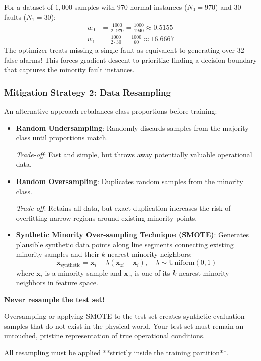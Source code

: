 For a dataset of $1{,}000$ samples with $970$ normal instances ($N_0 = 970$) and $30$ faults ($N_1 = 30$):
\begin{align*}
w_0 &= \frac{1000}{2 \cdot 970} = \frac{1000}{1940} \approx \mathbf{0.5155} \\
w_1 &= \frac{1000}{2 \cdot 30} = \frac{1000}{60} \approx \mathbf{16.6667}
\end{align*}
The optimizer treats missing a single fault as equivalent to generating over $32$ false alarms! This forces gradient descent to prioritize finding a decision boundary that captures the minority fault instances.

\subsubsection{Mitigation Strategy 2: Data Resampling}
An alternative approach rebalances class proportions before training:
\begin{itemize}
    \item \textbf{Random Undersampling}: Randomly discards samples from the majority class until proportions match.
    
    \textit{Trade-off}: Fast and simple, but throws away potentially valuable operational data.
    
    \item \textbf{Random Oversampling}: Duplicates random samples from the minority class.
    
    \textit{Trade-off}: Retains all data, but exact duplication increases the risk of overfitting narrow regions around existing minority points.
    
    \item \textbf{Synthetic Minority Over-sampling Technique (SMOTE)}: Generates plausible synthetic data points along line segments connecting existing minority samples and their $k$-nearest minority neighbors:
    \begin{equation}
    \mathbf{x}_{\text{synthetic}} = \mathbf{x}_i + \lambda (\mathbf{x}_{zi} - \mathbf{x}_i), \quad \lambda \sim \text{Uniform}(0, 1)\label{eq:smote_interpolation}
    \end{equation}
    where $\mathbf{x}_i$ is a minority sample and $\mathbf{x}_{zi}$ is one of its $k$-nearest minority neighbors in feature space.
\end{itemize}

\begin{warning}
\textbf{Never resample the test set!} 

Oversampling or applying SMOTE to the test set creates synthetic evaluation samples that do not exist in the physical world. Your test set must remain an untouched, pristine representation of true operational conditions. 

All resampling must be applied **strictly inside the training partition**.
\end{warning}

